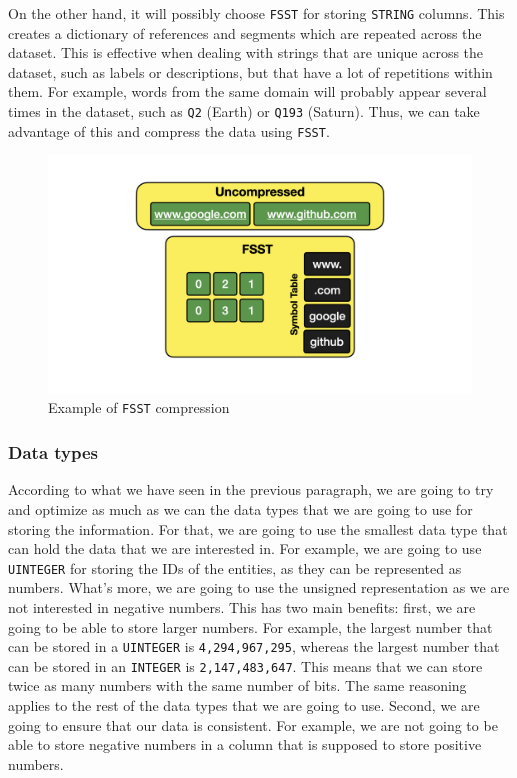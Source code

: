On the other hand, it will possibly choose \texttt{FSST} for storing \texttt{STRING} columns. This creates a dictionary of references and segments which are repeated across the dataset. This is effective when dealing with strings that are unique across the dataset, such as labels or descriptions, but that have a lot of repetitions within them. For example, words from the same domain will probably appear several times in the dataset, such as \texttt{Q2} (Earth) or \texttt{Q193} (Saturn). Thus, we can take advantage of this and compress the data using \texttt{FSST}.

\begin{figure}[ht]
    \centering
    \includegraphics[width=.8\linewidth]{figures/diagrams/10-3_fsst.png}
    \caption[Example of \texttt{FSST} compression]{Example of \texttt{FSST} compression \cite{Raasveldt_2022}}
\end{figure}

\subsubsection{Data types}

According to what we have seen in the previous paragraph, we are going to try and optimize as much as we can the data types that we are going to use for storing the information. For that, we are going to use the smallest data type that can hold the data that we are interested in. For example, we are going to use \texttt{UINTEGER} for storing the IDs of the entities, as they can be represented as numbers. What's more, we are going to use the unsigned representation as we are not interested in negative numbers. This has two main benefits: first, we are going to be able to store larger numbers. For example, the largest number that can be stored in a \texttt{UINTEGER} is \texttt{4,294,967,295}, whereas the largest number that can be stored in an \texttt{INTEGER} is \texttt{2,147,483,647}. This means that we can store twice as many numbers with the same number of bits. The same reasoning applies to the rest of the data types that we are going to use. Second, we are going to ensure that our data is consistent. For example, we are not going to be able to store negative numbers in a column that is supposed to store positive numbers.

